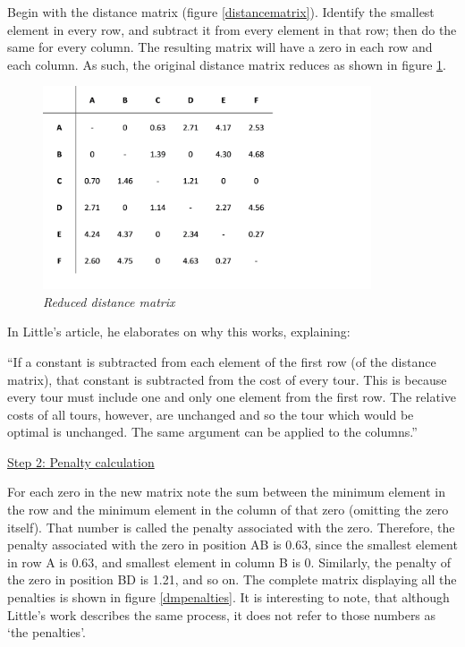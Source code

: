 \noindent
Begin with the distance matrix (figure \ref{distancematrix}). Identify the smallest element in every row, and subtract it from every element in that row; then do the same for every column. The resulting matrix will have a zero in each row and each column. As such, the original distance matrix reduces as shown in figure \ref{dmreduced}.

\begin{figure}[H] 
	\centering
	\includegraphics[height=6cm]{dmreduced}
	\vspace{-3mm}
	\caption{\textsl{Reduced distance matrix}}
	\label{dmreduced}
\end{figure}
\noindent	
In Little’s article, he elaborates on why this works, explaining:
\vspace{-1mm}

\begin{displayquote} 
``If a constant is subtracted from each element of the first row (of the distance matrix), that constant is subtracted from the cost of every tour. This is because every tour must include one and only one element from the first row. The relative costs of all tours, however, are unchanged and so the tour which would be optimal is unchanged. The same argument can be applied to the columns.'' \cite{little}
\end{displayquote}

\vspace{3mm}	
\noindent	
\underline{Step 2: Penalty calculation}	
\vspace{1mm}

\noindent	
For each zero in the new matrix note the sum between the minimum element in the row and the minimum element in the column of that zero (omitting the zero itself). That number is called the penalty associated with the zero. Therefore, the penalty associated with the zero in position AB is 0.63, since the smallest element in row A is 0.63, and smallest element in column B is 0. Similarly, the penalty of the zero in position BD is 1.21, and so on. The complete matrix displaying all the penalties is shown in figure \ref{dmpenalties}. It is interesting to note, that although Little’s work describes the same process, it does not refer to those numbers as `the penalties'.

